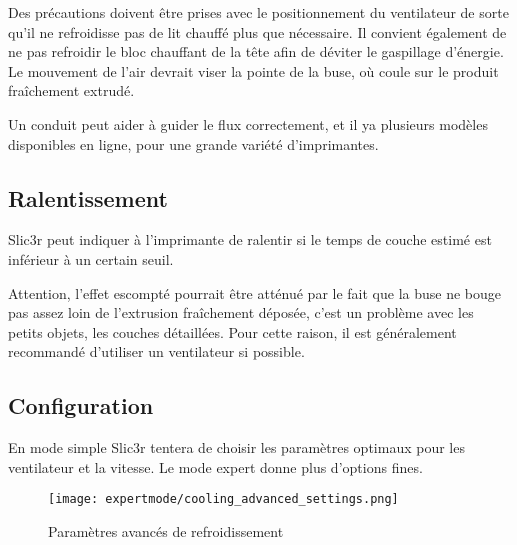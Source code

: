 Des pr\'ecautions doivent \^etre prises avec le positionnement du ventilateur de sorte qu'il ne refroidisse pas de lit chauff\'e plus que n\'ecessaire. Il convient \'egalement de ne pas refroidir le bloc chauffant de la t\^ete afin de d\'eviter le gaspillage d'\'energie. Le mouvement de l'air devrait viser la pointe de la buse, o\`u coule sur le produit fra\^ichement extrud\'e.

Un conduit peut aider \`a guider le flux correctement, et il ya plusieurs mod\`eles disponibles en ligne, pour une grande vari\'et\'e d'imprimantes.


\subsection{Ralentissement} %
\label{sub:slowing_down}
Slic3r peut indiquer \`a l'imprimante de ralentir si le temps de couche estim\'e est inf\'erieur \`a un certain seuil.

Attention, l'effet escompt\'e pourrait \^etre att\'enu\'e par le fait que la buse ne bouge pas assez loin de l'extrusion fra\^ichement d\'epos\'ee, c'est un probl\`eme avec les petits objets, les couches d\'etaill\'ees. Pour cette raison, il est g\'en\'eralement recommand\'e d'utiliser un ventilateur si possible.

\subsection{Configuration} %
\label{sub:configuring_cooling}

En mode simple Slic3r tentera de choisir les param\`etres optimaux pour les ventilateur et la vitesse. Le mode expert donne plus d'options fines.

\begin{figure}[H]
\centering
\texttt{[image: expertmode/cooling\_advanced\_settings.png]}
\caption{Param\`etres avanc\'es de refroidissement}
\label{fig:cooling_advanced_settings}
\end{figure}

